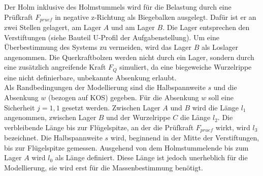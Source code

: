 \noindent Der Holm inklusive des Holmstummels wird für die Belastung durch eine Prüfkraft $F_{pruef}$ in negative z-Richtung als Biegebalken ausgelegt. Dafür ist er an zwei Stellen gelagert, am Lager $A$ und am Lager $B$. Die Lager entsprechen den Verstiftungen (siehe Bauteil U-Profil der Aufgabenstellung). Um eine Überbestimmung des Systems zu vermeiden, wird das Lager $B$ als Loslager angenommen. Die Querkraftbolzen werden nicht durch ein Lager, sondern durch eine zusätzlich angreifende Kraft $F_{Q}$ simuliert, da eine biegeweiche Wurzelrippe eine nicht definierbare, unbekannte Absenkung erlaubt.\\

\noindent Als Randbedingungen der Modellierung sind die Halbspannweite $s$ und die Absenkung $w$ (bezogen auf KOS) gegeben. Für die Absenkung $w$ soll eine Sicherheit $j=1,1$ gesetzt werden. Zwischen Lager $A$ und $B$ wird die Länge $l_{1}$ angenommen, zwischen Lager $B$ und der Wurzelrippe $C$ die Länge $l_{2}$. Die verbleibende Länge bis zur Flügelspitze, an der die Prüfkraft $F_{pruef}$ wirkt, wird $l_{3}$ bezeichnet. Die Halbspannweite $s$ wird, beginnend in der Mitte der Verstiftungen, bis zur Flügelspitze gemessen. Ausgehend von dem Holmstummelende bis zum Lager $A$ wird $l_{0}$ als Länge definiert. Diese Länge ist jedoch unerheblich für die Modellierung, sie wird erst für die Massenbestimmung benötigt.\\


